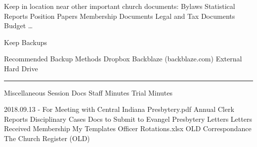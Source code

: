 \documentclass[
]{book}
\begin{document}
Keep in location near other important church documents:
Bylaws
Statistical Reports
Position Papers
Membership Documents
Legal and Tax Documents
Budget
\ldots{}

Keep Backups

Recommended Backup Methods
Dropbox
Backblaze (backblaze.com)
External Hard Drive

\begin{center}\rule{0.5\linewidth}{0.5pt}\end{center}

Miscellaneous Session Docs
Staff Minutes
Trial Minutes

2018.09.13 - For Meeting with Central Indiana Presbytery.pdf
Annual Clerk Reports
Disciplinary Cases
Docs to Submit to Evangel Presbytery
Letters
Letters Received
Membership
My Templates
Officer Rotations.xlsx
OLD Correspondance
The Church Register (OLD)
\end{document}
